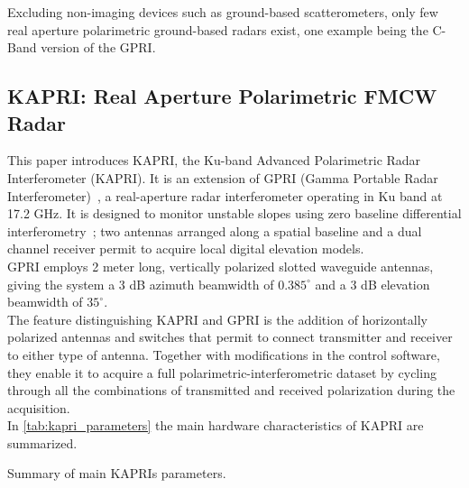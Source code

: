 Excluding non-imaging devices such as ground-based scatterometers, only few real aperture polarimetric ground-based radars exist, one example being the C-Band version of the GPRI\cite{Cherukumilli2012}.
\subsection{KAPRI: Real Aperture Polarimetric FMCW Radar}
This paper introduces KAPRI, the Ku-band  Advanced Polarimetric Radar Interferometer (KAPRI)\cite{Baffelli2016a}. It is an extension of GPRI (Gamma Portable Radar Interferometer)~\cite{werner_gpri_2012,Strozzi2011, Werner2008}, a real-aperture radar interferometer operating in Ku band at 17.2 GHz. It is designed 
to monitor unstable slopes using zero baseline differential interferometry~\cite{Massonnet1993}; two antennas arranged along a spatial baseline and a dual channel receiver permit to acquire local digital elevation models.\\
GPRI employs  2 meter long, vertically polarized slotted waveguide antennas, giving the system a 3 dB azimuth beamwidth of $0.385^\circ$ and a 3 dB elevation beamwidth of $35^\circ$.\\
The feature distinguishing KAPRI and GPRI is the addition of horizontally polarized antennas and switches that permit to connect transmitter and receiver to either type of antenna. Together with modifications in the control software, they enable it to acquire a full polarimetric-interferometric dataset by cycling through all the combinations of transmitted and received polarization during the acquisition.\\  In \autoref{tab:kapri_parameters} the main hardware characteristics of KAPRI are summarized.
\begin{table*}
	\centering
	\caption{Summary of main KAPRIs parameters.}
	\label{tab:kapri_parameters}
\end{table*}
